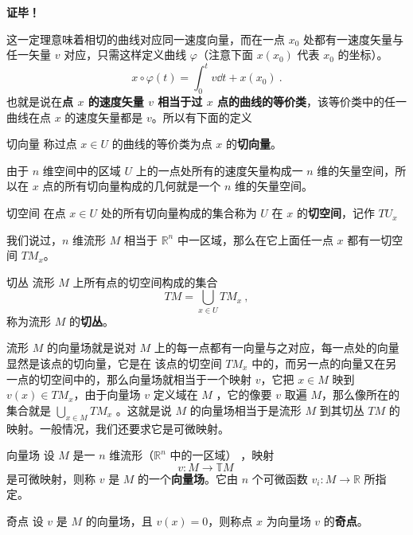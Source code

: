 \textbf{证毕！}

这一定理意味着相切的曲线对应同一速度向量，而在一点 $x_0$ 处都有一速度矢量与任一矢量 $v$ 对应，只需这样定义曲线 $\varphi$（注意下面 $x(x_0)$ 代表 $x_0$ 的坐标）。
\begin{equation}
x\circ\varphi(t)=\int_0^t v\dd t+x(x_0)~.
\end{equation}
也就是说在\textbf{点 $x$ 的速度矢量 $v$ 相当于过 $x$ 点的曲线的等价类}，该等价类中的任一曲线在点 $x$ 的速度矢量都是 $v$。所以有下面的定义
\begin{definition}{切向量}\label{def_GofODE_3}
称过点 $x\in U$ 的曲线的等价类为点 $x$ 的\textbf{切向量}。
\end{definition}

由于 $n$ 维空间中的区域 $U$ 上的一点处所有的速度矢量构成一 $n$ 维的矢量空间，所以在 $x$ 点的所有切向量构成的几何就是一个 $n$ 维的矢量空间。
\begin{definition}{切空间}\label{def_GofODE_4}
在点 $x\in U$ 处的所有切向量构成的集合称为 $U$ 在 $x$ 的\textbf{切空间}，记作 $TU_x$
\end{definition}

我们说过，$n$ 维流形 $M$ 相当于 $\mathbb R^n$ 中一区域，那么在它上面任一点 $x$ 都有一切空间 $TM_x$。
\begin{definition}{切丛}
流形 $M$ 上所有点的切空间构成的集合
\begin{equation}
TM=\bigcup_{x\in U}TM_x~,
\end{equation}
称为流形 $M$ 的\textbf{切丛}。
\end{definition} 
流形 $M$ 的向量场就是说对 $M$ 上的每一点都有一向量与之对应，每一点处的向量显然是该点的切向量，它是在 该点的切空间 $TM_x$ 中的，而另一点的向量又在另一点的切空间中的，那么向量场就相当于一个映射 $v$，它把 $x\in M$ 映到 $v(x)\in TM_x$，由于向量场 $v$ 定义域在 $M$ ，它的像要 $v$ 取遍 $M$，那么像所在的集合就是
$\bigcup_{x\in M} TM_x$ 。这就是说 $M$ 的向量场相当于是流形 $M$ 到其切丛 $TM$ 的映射。一般情况，我们还要求它是可微映射。
\begin{definition}{向量场}\label{def_GofODE_6}
设 $M$ 是一 $n$ 维流形（$\mathbb R^n$ 中的一区域） ，映射
\begin{equation}
v:M\rightarrow\mathbb TM~
\end{equation}
是可微映射，则称 $v$ 是 $M$ 的一个\textbf{向量场}。它由 $n$ 个可微函数 $v_i:M\rightarrow \mathbb R$ 所指定。 
\end{definition}
\begin{definition}{奇点}
设 $v$ 是 $M$ 的向量场，且 $v(x)=0$，则称点 $x$ 为向量场 $v$ 的\textbf{奇点}。
\end{definition}
